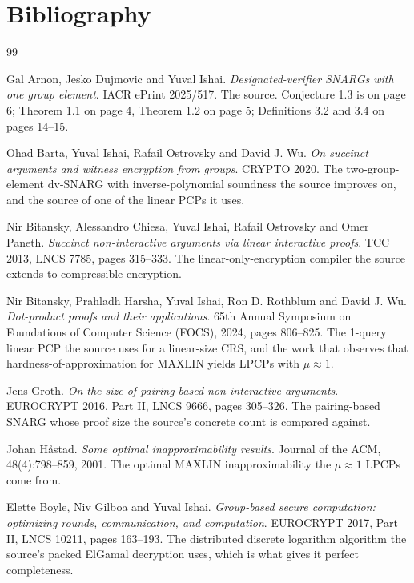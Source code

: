 \documentclass{aicr-conjecture}
\begin{document}
\section{Bibliography}

\begin{aicrbibliography}{99}

Gal Arnon, Jesko Dujmovic and Yuval Ishai.
\emph{Designated-verifier SNARGs with one group element}.
IACR ePrint 2025/517.
The source. Conjecture 1.3 is on page 6; Theorem 1.1 on page 4,
Theorem 1.2 on page 5; Definitions 3.2 and 3.4 on pages 14--15.

Ohad Barta, Yuval Ishai, Rafail Ostrovsky and David J. Wu.
\emph{On succinct arguments and witness encryption from groups}.
CRYPTO 2020.
The two-group-element dv-SNARG with inverse-polynomial soundness the
source improves on, and the source of one of the linear PCPs it uses.

Nir Bitansky, Alessandro Chiesa, Yuval Ishai, Rafail Ostrovsky and Omer
Paneth.
\emph{Succinct non-interactive arguments via linear interactive proofs}.
TCC 2013, LNCS 7785, pages 315--333.
The linear-only-encryption compiler the source extends to compressible
encryption.

Nir Bitansky, Prahladh Harsha, Yuval Ishai, Ron D. Rothblum and
David J. Wu.
\emph{Dot-product proofs and their applications}.
65th Annual Symposium on Foundations of Computer Science (FOCS), 2024,
pages 806--825.
The 1-query linear PCP the source uses for a linear-size CRS, and the
work that observes that hardness-of-approximation for $\mathrm{MAXLIN}$
yields LPCPs with $\mu \approx 1$.

Jens Groth.
\emph{On the size of pairing-based non-interactive arguments}.
EUROCRYPT 2016, Part II, LNCS 9666, pages 305--326.
The pairing-based SNARG whose proof size the source's concrete count is
compared against.

Johan H\aa{}stad.
\emph{Some optimal inapproximability results}.
Journal of the ACM, 48(4):798--859, 2001.
The optimal $\mathrm{MAXLIN}$ inapproximability the $\mu \approx 1$ LPCPs
come from.

Elette Boyle, Niv Gilboa and Yuval Ishai.
\emph{Group-based secure computation: optimizing rounds, communication,
and computation}.
EUROCRYPT 2017, Part II, LNCS 10211, pages 163--193.
The distributed discrete logarithm algorithm the source's packed ElGamal
decryption uses, which is what gives it perfect completeness.

\end{aicrbibliography}
\end{document}
